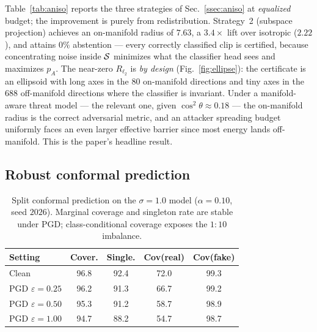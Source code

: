 Table~\ref{tab:aniso} reports the three strategies of Sec.~\ref{ssec:aniso} at \emph{equalized} budget; the improvement is purely from redistribution. Strategy~2 (subspace projection) achieves an on-manifold radius of $7.63$, a $3.4\times$ lift over isotropic ($2.22$), and attains $0\%$ abstention --- every correctly classified clip is certified, because concentrating noise inside $\mathcal{S}$ minimizes what the classifier head sees and maximizes $p_A$. The near-zero $R_{\ell_2}$ is \emph{by design} (Fig.~\ref{fig:ellipse}): the certificate is an ellipsoid with long axes in the $80$ on-manifold directions and tiny axes in the $688$ off-manifold directions where the classifier is invariant. Under a manifold-aware threat model --- the relevant one, given $\cos^2\theta\!\approx\!0.18$ --- the on-manifold radius is the correct adversarial metric, and an attacker spreading budget uniformly faces an even larger effective barrier since most energy lands off-manifold. This is the paper's headline result.

\subsection{Robust conformal prediction}

\begin{table}[t]
\centering
\caption{Split conformal prediction on the $\sigma=1.0$ model ($\alpha=0.10$, seed $2026$). Marginal coverage and singleton rate are stable under PGD; class-conditional coverage exposes the $1{:}10$ imbalance.}
\label{tab:conformal}
\footnotesize
\setlength{\tabcolsep}{4pt}
\begin{tabular}{lcccc}
\toprule
Setting & Cover. & Single. & Cov(real) & Cov(fake) \\
\midrule
Clean & 96.8 & 92.4 & 72.0 & 99.3 \\
PGD $\varepsilon{=}0.25$ & 96.2 & 91.3 & 66.7 & 99.2 \\
PGD $\varepsilon{=}0.50$ & 95.3 & 91.2 & 58.7 & 98.9 \\
PGD $\varepsilon{=}1.00$ & 94.7 & 88.2 & 54.7 & 98.7 \\
\bottomrule
\end{tabular}
\end{table}

